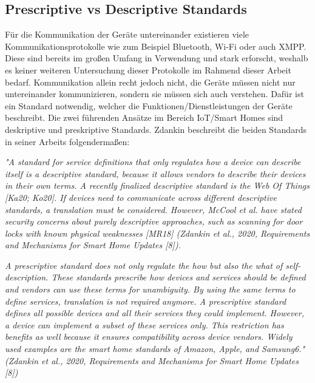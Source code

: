 \newpage
\subsection{Prescriptive vs Descriptive Standards}
Für die Kommunikation der Geräte untereinander existieren viele Kommunikationsprotokolle wie zum Beispiel Bluetooth,
Wi-Fi oder auch XMPP. Diese sind bereits im großen Umfang in Verwendung und stark erforscht, weshalb es keiner weiteren
Untersuchung dieser Protokolle im Rahmend dieser Arbeit bedarf.
Kommunikation allein recht jedoch nicht, die Geräte müssen nicht nur untereinander kommunizieren, sondern sie müssen sich auch 
verstehen. Dafür ist ein Standard notwendig, welcher die Funktionen/Dienstleistungen der Geräte beschreibt.
Die zwei führenden Ansätze im Bereich IoT/Smart Homes sind deskriptive und preskriptive Standards.
Zdankin beschreibt die beiden Standards in seiner Arbeits folgendermaßen:

\textit{
"A standard for service definitions that only regulates how a device can describe itself is
a descriptive standard, because it allows vendors to describe their devices in their own
terms. A recently finalized descriptive standard is the Web Of Things [Ka20; Ko20]. If
devices need to communicate across different descriptive standards, a translation must be
considered. However, McCool et al. have stated security concerns about purely descriptive
approaches, such as scanning for door locks with known physical weaknesses [MR18] (Zdankin et al., 2020, Requirements and Mechanisms for Smart Home Updates [8]).}


\textit{
A prescriptive standard does not only regulate the how but also the what of self-description.
These standards prescribe how devices and services should be defined and vendors can use
these terms for unambiguity. By using the same terms to define services, translation is not
required anymore. A prescriptive standard defines all possible devices and all their services
they could implement. However, a device can implement a subset of these services only.
This restriction has benefits as well because it ensures compatibility across device vendors.
Widely used examples are the smart home standards of Amazon, Apple, and Samsung6."
(Zdankin et al., 2020, Requirements and Mechanisms for Smart Home Updates [8])}

